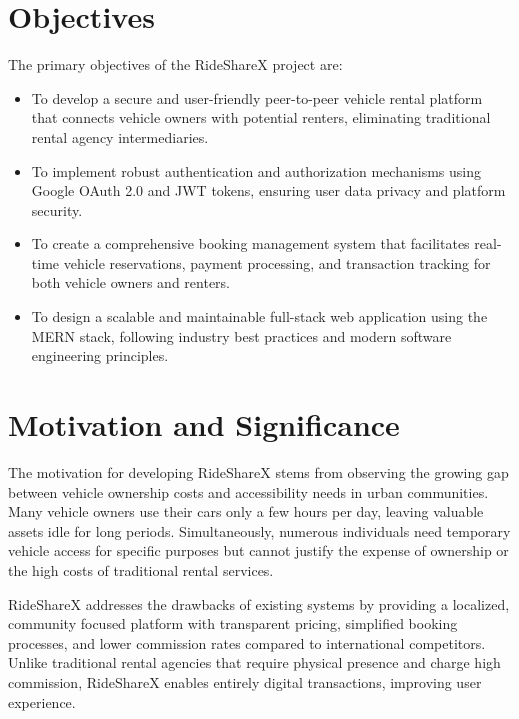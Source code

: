 \documentclass[12pt,a4paper]{report}
\begin{document}
	
	\section{Objectives}
	The primary objectives of the RideShareX project are:
	
	\begin{itemize}
		\item To develop a secure and user-friendly peer-to-peer vehicle rental platform that connects vehicle owners with potential renters, eliminating traditional rental agency intermediaries.
		
	\item To implement robust authentication and authorization mechanisms using Google OAuth 2.0\cite{oauth} and JWT\cite{jwt} tokens, ensuring user data privacy and platform security.
		
	\item To create a comprehensive booking management system that facilitates real-time vehicle reservations, payment processing, and transaction tracking for both vehicle owners and renters.
		
	\item To design a scalable and maintainable full-stack web application using the MERN stack\cite{mern}, following industry best practices and modern software engineering principles.
	\end{itemize}
	
	\section{Motivation and Significance}
	The motivation for developing RideShareX stems from observing the growing gap between vehicle ownership costs and accessibility needs in urban communities. Many vehicle owners use their cars only a few hours per day, leaving valuable assets idle for long periods. Simultaneously, numerous individuals need temporary vehicle access for specific purposes but cannot justify the expense of ownership or the high costs of traditional rental services. 

    
    RideShareX addresses the drawbacks of existing systems by providing a localized, community focused platform with transparent pricing, simplified booking processes, and lower commission rates compared to international competitors. Unlike traditional rental agencies that require physical presence and charge high commission, RideShareX enables entirely digital transactions, improving user experience.
\end{document}
